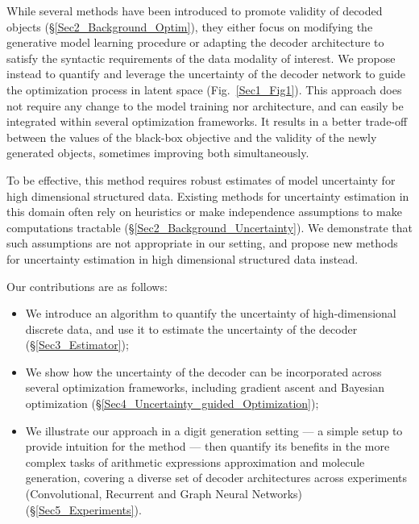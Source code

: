 While several methods have been introduced to promote validity of decoded objects (\S\ref{Sec2_Background_Optim}), they either focus on modifying the generative model learning procedure or adapting the decoder architecture to satisfy the syntactic requirements of the data modality of interest. We propose instead to quantify and leverage the uncertainty of the decoder network to guide the optimization process in latent space (Fig.~\ref{Sec1_Fig1}). This approach does not require any change to the model training nor architecture, and can easily be integrated within several optimization frameworks. It results in a better trade-off between the values of the black-box objective and the validity of the newly generated objects, sometimes improving both simultaneously.

To be effective, this method requires robust estimates of model uncertainty for high dimensional structured data. Existing methods for uncertainty estimation in this domain often rely on heuristics or make independence assumptions to make computations tractable (\S\ref{Sec2_Background_Uncertainty}). We demonstrate that such assumptions are not appropriate in our setting, and propose new methods for uncertainty estimation in high dimensional structured data instead. 

Our contributions are as follows:
\begin{itemize}
\item We introduce an algorithm to quantify the uncertainty of high-dimensional discrete data, and use it to estimate the uncertainty of the decoder (\S\ref{Sec3_Estimator});
\item We show how the uncertainty of the decoder can be incorporated across several optimization frameworks, including gradient ascent and Bayesian optimization (\S\ref{Sec4_Uncertainty_guided_Optimization});
\item We illustrate our approach in a digit generation setting --- a simple setup to provide intuition for the method --- then quantify its benefits in the more complex tasks of arithmetic expressions approximation and molecule generation, covering a diverse set of decoder architectures across experiments (Convolutional, Recurrent and Graph Neural Networks) (\S\ref{Sec5_Experiments}).
\end{itemize}